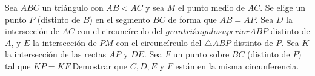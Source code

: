 Sea $ABC$ un triángulo con $AB<AC$ y sea $M$ el punto medio de $AC$. Se elige un punto $P$ (distinto de $B$) en el segmento $BC$ de forma que $AB=AP$. Sea $D$ la intersección de $AC$ con el circuncírculo del $gran triángulo superior ABP$ distinto de $A$, y $E$ la intersección de $PM$ con el circuncírculo del $\triangle ABP$ distinto de $P$. Sea $K$ la intersección de las rectas $AP$ y $DE$. Sea $F$ un punto sobre $BC$ (distinto de $P$) tal que $KP=KF$.Demostrar que $C, D, E$ y $F$ están en la misma circunferencia.
